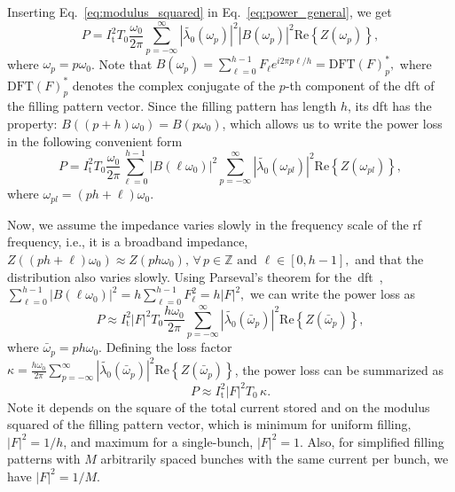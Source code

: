 \documentclass
[
    a4paper,
]{jacow}
\providecommand{\Real}[1]{\ensuremath{\mathrm{Re}\left\{#1\right\}}}
\begin{document}
    Inserting Eq.~\eqref{eq:modulus_squared} in Eq.~\eqref{eq:power_general}, we get
    \begin{equation}
        P = I_\mathrm{t}^2T_0 \frac{\omega_0}{2\pi}\sum_{p=-\infty}^{\infty} \left|\tilde{\lambda_0}(\omega_p)\right|^2 \left|B(\omega_p)\right|^2\Real{Z(\omega_p)},
    \end{equation}
    where $\omega_p = p\omega_0$. Note that
    $
        B(\omega_p) = \sum_{\ell=0}^{h-1}F_\ell e^{i2\pi p\ell/h} = \mathrm{DFT}(F)^*_p,
    $
    where $\mathrm{DFT}(F)^*_p$ denotes the complex conjugate of the $p$-th component of the \gls{dft} of the filling pattern vector. Since the filling pattern has length $h$, its \gls{dft} has the property:
    $
        B((p+h)\omega_0) = B(p\omega_0)
    $,
    which allows us to write the power loss in the following convenient form
    \begin{equation}
        P = I_\mathrm{t}^2T_0 \frac{\omega_0}{2\pi}\sum_{\ell=0}^{h-1} \left|B(\ell\omega_0)\right|^2\sum_{p=-\infty}^{\infty} \left|\tilde{\lambda_0}(\omega_{pl})\right|^2 \Real{Z(\omega_{pl})},
    \end{equation}
    where $\omega_{pl} = (ph+\ell)\omega_0$.
    
    Now, we assume the impedance varies slowly in the frequency scale of the rf frequency, i.e., it is a broadband impedance,
    $
        Z((ph+\ell)\omega_0) \approx Z(ph\omega_0), \, \forall\, p \in\mathbb{Z}\,\,\mathrm{and}\,\, \ell \in[0,h-1],
    $
    and that the distribution also varies slowly. Using Parseval's theorem for the~\gls{dft}~\cite{Wikipedia_DFT},
    $
        \sum_{\ell=0}^{h-1} \left|B(\ell\omega_0)\right|^2 = h\sum_{\ell=0}^{h-1} F_\ell^2 = h|F|^2,
    $
    we can write the power loss as
    \begin{equation}
        P \approx I_\mathrm{t}^2 \left|F\right|^2 T_0 \frac{h\omega_0}{2\pi}\sum_{p=-\infty}^{\infty} \left|\tilde{\lambda_0}(\bar{\omega}_p)\right|^2 \Real{Z(\bar{\omega}_p)},
    \end{equation}
    where $\bar{\omega}_p = ph\omega_0$. Defining the loss factor
    $
        \kappa = \frac{h\omega_0}{2\pi}\sum_{p=-\infty}^{\infty} \left|\tilde{\lambda_0}(\bar{\omega}_p)\right|^2 \Real{Z(\bar{\omega}_p)}
    $,
    the power loss can be summarized as
    \begin{equation}\label{eq:power_broadband}
        P \approx I_\mathrm{t}^2 \left|F\right|^2 T_0\, \kappa.
    \end{equation}
    Note it depends on the square of the total current stored and on the modulus squared of the filling pattern vector, which is minimum for uniform filling, $|F|^2=1/h$, and maximum for a single-bunch, $|F|^2=1$. Also, for simplified filling patterns with $M$ arbitrarily spaced bunches with the same current per bunch, we have $|F|^2=1/M$.
\end{document}
